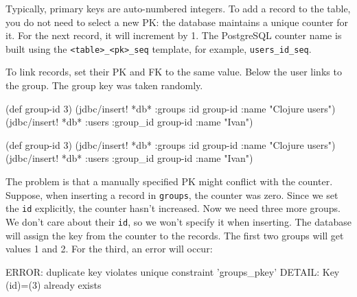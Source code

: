 
Typically, primary keys are auto-numbered integers. To add a record to the table, you do not need to select a new PK: the database maintains a unique counter for it. For the next record, it will increment by 1. The PostgreSQL counter name is built using the \verb|<table>_<pk>_seq| template, for example, \verb|users_id_seq|.

To link records, set their PK and FK to the same value. Below the user links to the group. The group key was taken randomly.

\ifx\DEVICETYPE\MOBILE

\begin{english}
  \begin{clojure}
(def group-id 3)
(jdbc/insert! *db* :groups
  {:id group-id :name "Clojure users"})
(jdbc/insert! *db* :users
  {:group_id group-id :name "Ivan"})
  \end{clojure}
\end{english}

\else

\begin{english}
  \begin{clojure}
(def group-id 3)
(jdbc/insert! *db* :groups {:id group-id :name "Clojure users"})
(jdbc/insert! *db* :users {:group_id group-id :name "Ivan"})
  \end{clojure}
\end{english}

\fi

The problem is that a manually specified PK might conflict with the counter. Suppose, when inserting a record in \verb|groups|, the counter was zero. Since we set the \verb|id| explicitly, the counter hasn't increased. Now we need three more groups. We don't care about their \verb|id|, so we won't specify it when inserting. The database will assign the key from the counter to the records. The first two groups will get values 1 and 2. For the third, an error will occur:


\ifx\DEVICETYPE\MOBILE

\begin{english}
  \begin{text}
ERROR: duplicate key violates
       unique constraint 'groups_pkey'
DETAIL: Key (id)=(3) already exists
  \end{text}
\end{english}

\else

